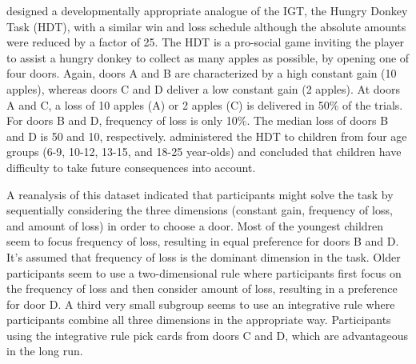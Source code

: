 \documentclass[a4paper,12pt,man]{apa} %
\newcommand{\citet}{\citeA}
\begin{document}
\citet{Crone2004} designed a developmentally appropriate analogue of
the IGT, the Hungry Donkey Task (HDT), with a similar win and loss
schedule although the absolute amounts were reduced by a factor of 25.
The HDT is a pro-social game inviting the player to assist a hungry
donkey to collect as many apples as possible, by opening one of four
doors.  Again, doors A and B are characterized by a high constant gain
(10 apples), whereas doors C and D deliver a low constant gain (2
apples).  At doors A and C, a loss of 10 apples (A) or 2 apples (C)
is delivered in 50\% of the trials.  For doors B and D, frequency of
loss is only 10\%.  The median loss of doors B and D is 50 and 10,
respectively.  \citet{Crone2004} administered the HDT to children from
four age groups (6-9, 10-12, 13-15, and 18-25 year-olds) and concluded
that children have difficulty to take future consequences into account.

A reanalysis of this dataset \cite{Huizenga2007b} indicated that
participants might solve the task by sequentially considering the
three dimensions (constant gain, frequency of loss, and amount of
loss) in order to choose a door.  Most of the youngest children seem
to focus frequency of loss, resulting in equal preference for doors B
and D. It's assumed that frequency of loss is the dominant dimension
in the task.  Older participants seem to use a two-dimensional rule
where participants first focus on the frequency of loss and then
consider amount of loss, resulting in a preference for door D. A third
very small subgroup seems to use an integrative rule where
participants combine all three dimensions in the appropriate way.
Participants using the integrative rule pick cards from doors C and D,
which are advantageous in the long run.

\end{document}
